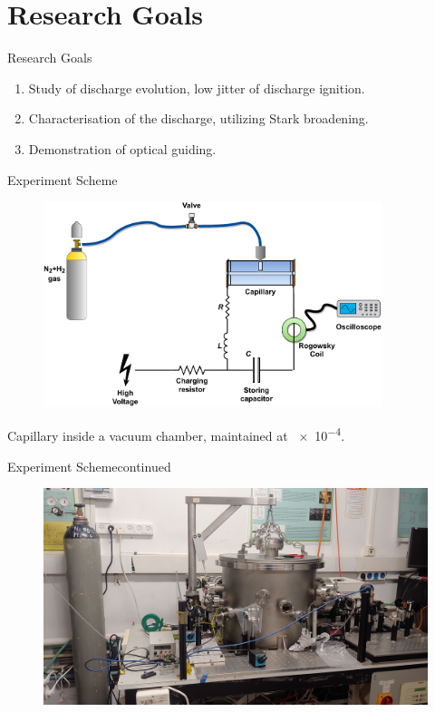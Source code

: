 \documentclass[dvipsnames]{beamer}
\begin{document}
\section{Research Goals}
\begin{frame}{Research Goals}
 \begin{enumerate}
\item Study of discharge evolution, low jitter of discharge ignition.
\item Characterisation of the discharge, utilizing Stark broadening.
\item Demonstration of optical guiding.
 \end{enumerate}
\end{frame}
\begin{frame}{Experiment Scheme}
\begin{figure}
 \includegraphics[height=170pt]{figures/results/jitter/discharge_scheme.pdf}
\end{figure}
Capillary inside a vacuum chamber, maintained at \SI{e-4}{\torr}.
\end{frame}
\begin{frame}{Experiment Scheme}{continued}
\begin{figure}
 \includegraphics[width=\textwidth]{figures/results/jitter/system_picture.jpg}
\end{figure}
\end{frame}
\end{document}
